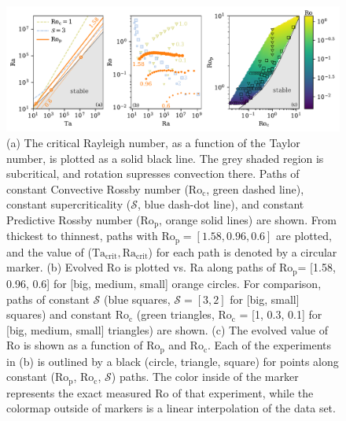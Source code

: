 \documentclass[twocolumn, amsmath, amsfonts, amssymb, trackchanges]{aastex62}
\newcommand{\pro}{\ensuremath{\text{Ro}_{\text{p}}}}
\newcommand{\con}{\ensuremath{\text{Ro}_{\text{c}}}}
\begin{document}
\begin{figure}[t!]
    \includegraphics[width=\textwidth]{parameter_space.pdf}
    \caption{(a) The critical Rayleigh number, as a function of the Taylor number, 
    is plotted as a solid black line. The grey shaded region is subcritical, and rotation
    supresses convection there. Paths of constant Convective Rossby number
    ($\con$, green dashed line), constant supercriticality ($\mathcal{S}$, blue dash-dot line), and 
    constant Predictive Rossby number (\pro, orange solid lines) are shown. 
	From thickest to thinnest, paths with $\pro = [1.58, 0.96, 0.6]$ are plotted,
	and the value of
	($\text{Ta}_{\text{crit}}, \text{Ra}_{\text{crit}}$) for each path is denoted by a
	circular marker.
    (b) Evolved Ro is plotted vs. Ra along paths of \pro = [1.58, 0.96, 0.6] for [big, medium, small] orange circles.
    For comparison, paths of constant $\mathcal{S}$ (blue squares, $\mathcal{S} = [3,2]$ 
    for [big, small] squares)
    and constant $\con$ (green triangles, $\con$ = [1, 0.3, 0.1] for [big, medium, small] triangles) are shown.
    (c) The evolved value of Ro is shown as a function of $\pro$ and $\con$. 
	Each of the experiments in (b) is outlined by a black (circle, triangle, square)
	for points along constant (\pro, \con, $\mathcal{S}$) paths.
	The color inside of the marker represents the exact measured Ro of that experiment, 
	while the colormap outside of markers is a linear interpolation
	of the data set. 
    \label{fig:parameter_space} }
\end{figure}
\end{document}
